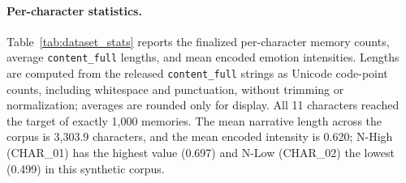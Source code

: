 \documentclass[11pt]{article}
\begin{document}
\begin{table}[ht]
\centering
\caption{Per-character dataset statistics.}
\label{tab:dataset_stats}


\end{table}
\paragraph{Per-character statistics.}
Table~\ref{tab:dataset_stats} reports the finalized per-character memory counts, average \texttt{content\_full} lengths, and mean encoded emotion intensities. Lengths are computed from the released \texttt{content\_full} strings as Unicode code-point counts, including whitespace and punctuation, without trimming or normalization; averages are rounded only for display. All 11 characters reached the target of exactly 1{,}000 memories. The mean narrative length across the corpus is 3{,}303.9 characters, and the mean encoded intensity is 0.620; N-High (CHAR\_01) has the highest value (0.697) and N-Low (CHAR\_02) the lowest (0.499) in this synthetic corpus.
\end{document}
